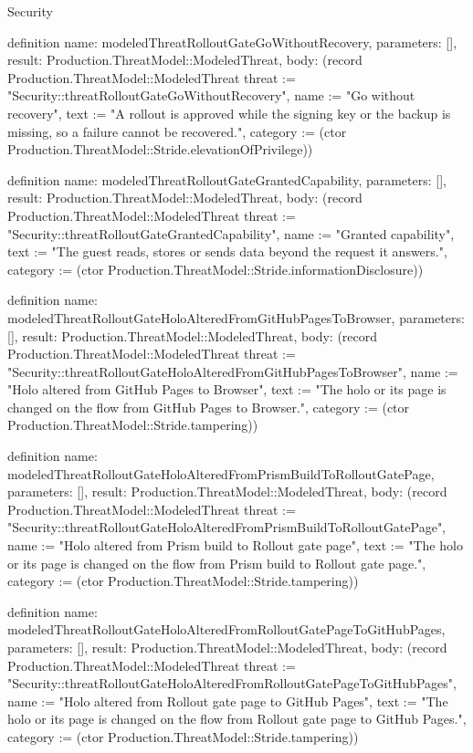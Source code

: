 \begin{lexlean}{Security}
\begin{semanticmodule}
definition{
  name: modeledThreatRolloutGateGoWithoutRecovery,
  parameters: [],
  result: Production.ThreatModel::ModeledThreat,
  body: (record Production.ThreatModel::ModeledThreat {threat := "Security::threatRolloutGateGoWithoutRecovery", name := "Go without recovery", text := "A rollout is approved while the signing key or the backup is missing, so a failure cannot be recovered.", category := (ctor Production.ThreatModel::Stride.elevationOfPrivilege)})
}

definition{
  name: modeledThreatRolloutGateGrantedCapability,
  parameters: [],
  result: Production.ThreatModel::ModeledThreat,
  body: (record Production.ThreatModel::ModeledThreat {threat := "Security::threatRolloutGateGrantedCapability", name := "Granted capability", text := "The guest reads, stores or sends data beyond the request it answers.", category := (ctor Production.ThreatModel::Stride.informationDisclosure)})
}

definition{
  name: modeledThreatRolloutGateHoloAlteredFromGitHubPagesToBrowser,
  parameters: [],
  result: Production.ThreatModel::ModeledThreat,
  body: (record Production.ThreatModel::ModeledThreat {threat := "Security::threatRolloutGateHoloAlteredFromGitHubPagesToBrowser", name := "Holo altered from GitHub Pages to Browser", text := "The holo or its page is changed on the flow from GitHub Pages to Browser.", category := (ctor Production.ThreatModel::Stride.tampering)})
}

definition{
  name: modeledThreatRolloutGateHoloAlteredFromPrismBuildToRolloutGatePage,
  parameters: [],
  result: Production.ThreatModel::ModeledThreat,
  body: (record Production.ThreatModel::ModeledThreat {threat := "Security::threatRolloutGateHoloAlteredFromPrismBuildToRolloutGatePage", name := "Holo altered from Prism build to Rollout gate page", text := "The holo or its page is changed on the flow from Prism build to Rollout gate page.", category := (ctor Production.ThreatModel::Stride.tampering)})
}

definition{
  name: modeledThreatRolloutGateHoloAlteredFromRolloutGatePageToGitHubPages,
  parameters: [],
  result: Production.ThreatModel::ModeledThreat,
  body: (record Production.ThreatModel::ModeledThreat {threat := "Security::threatRolloutGateHoloAlteredFromRolloutGatePageToGitHubPages", name := "Holo altered from Rollout gate page to GitHub Pages", text := "The holo or its page is changed on the flow from Rollout gate page to GitHub Pages.", category := (ctor Production.ThreatModel::Stride.tampering)})
}


\end{semanticmodule}
\end{lexlean}
